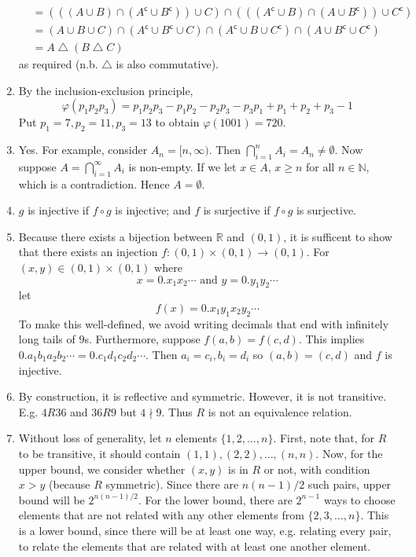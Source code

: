 \documentclass[10pt, a4paper, twoside]{report}
\begin{document}
\begin{enumerate}[{1.}]
\begin{align*}
        &=(((A\cup B)\cap(A^\mathsf{c}\cup B^\mathsf{c}))\cup C)\cap (((A^\mathsf{c}\cup B)\cap(A\cup B^\mathsf{c}))\cup C^\mathsf{c}) \\
        &=(A\cup B\cup C)\cap (A^\mathsf{c}\cup B^\mathsf{c}\cup C)\cap (A^\mathsf{c}\cup B\cup C^\mathsf{c})\cap (A\cup B^\mathsf{c}\cup C^\mathsf{c}) \\
        &=A\bigtriangleup(B\bigtriangleup C)
    \end{align*}
    as required (n.b. \(\bigtriangleup\) is also commutative).
    \item By the inclusion-exclusion principle,
    \[\varphi(p_1p_2p_3)=p_1p_2p_3-p_1p_2-p_2p_3-p_3p_1+p_1+p_2+p_3-1\]
    Put \(p_1=7,p_2=11,p_3=13\) to obtain \(\varphi(1001)=720\).
    \item Yes. For example, consider \(A_n=[n,\infty)\). Then \(\bigcap_{i=1}^nA_i=A_n\neq\emptyset\). Now suppose \(A=\bigcap_{i=1}^\infty A_i\) is non-empty. If we let \(x\in A\), \(x\geq n\) for all \(n\in\mathbb{N}\), which is a contradiction. Hence \(A=\emptyset\).
    \item \(g\) is injective if \(f\circ g\) is injective; and \(f\) is surjective if \(f\circ g\) is surjective.
    \item Because there exists a bijection between \(\mathbb{R}\) and \((0,1)\), it is sufficent to show that there exists an injection \(f:(0,1)\times(0,1)\to (0,1)\). For \((x,y)\in (0,1)\times(0,1)\) where 
    \[x=0.x_1x_2\cdots\text{  and  }y=0.y_1y_2\cdots\]
    let
    \[f(x)=0.x_1y_1x_2y_2\cdots\]
    To make this well-defined, we avoid writing decimals that end with infinitely long tails of \(9\)s. Furthermore, suppose \(f(a,b)=f(c,d)\). This implies \(0.a_1b_1a_2b_2\cdots=0.c_1d_1c_2d_2\cdots\). Then \(a_i=c_i, b_i=d_i\) so \((a,b)=(c,d)\) and \(f\) is injective.
    \item By construction, it is reflective and symmetric. However, it is not transitive. E.g. \(4R36\) and \(36R9\) but \(4\nmid 9\). Thus \(R\) is not an equivalence relation.
    \item Without loss of generality, let \(n\) elements \(\{1,2,\ldots,n\}\). First, note that, for \(R\) to be transitive, it should contain \((1,1),(2,2),\ldots,(n,n)\). Now, for the upper bound, we consider whether \((x,y)\) is in \(R\) or not, with condition \(x>y\) (because \(R\) symmetric). Since there are \(n(n-1)/2\) such pairs, upper bound will be \(2^{n(n-1)/2}\). For the lower bound, there are \(2^{n-1}\) ways to choose elements that are not related with any other elements from \(\{2,3,\ldots,n\}\). This is a lower bound, since there will be at least one way, e.g. relating every pair, to relate the elements that are related with at least one another element.
    

\end{enumerate}
\end{document}
